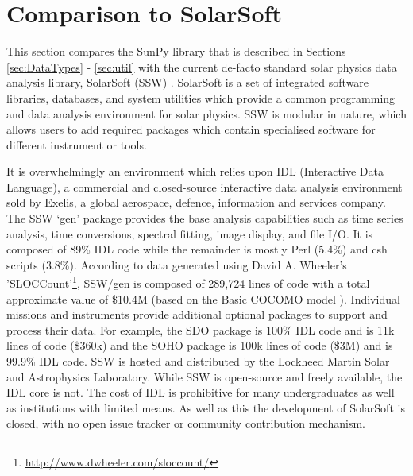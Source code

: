 \section{Comparison to SolarSoft}
This section compares the SunPy library that is described in Sections 
\ref{sec:DataTypes} - \ref{sec:util} with the current de-facto standard solar 
physics data analysis library, SolarSoft (SSW) \citep{freeland1998}.
SolarSoft is a set of integrated software libraries, databases, and system 
utilities which provide a common programming and data analysis environment for 
solar physics. SSW is modular in nature, which allows users to add required 
packages which contain specialised software for different instrument or tools.

It is overwhelmingly an environment which relies upon IDL (Interactive Data 
Language), a commercial and closed-source interactive data analysis environment 
sold by Exelis, a global aerospace, defence, information and services company. 
The SSW `gen' package provides the base analysis capabilities such as time 
series analysis, time conversions, spectral fitting, image display, and file 
I/O. It is composed of 89\% IDL code while the remainder is mostly Perl (5.4\%) 
and csh scripts (3.8\%). 
According to data generated using David A. Wheeler's 'SLOCCount'\footnote{\url{http://www.dwheeler.com/sloccount/}}, SSW/gen is composed of 
289,724 lines of code with a total approximate value of \$10.4M (based on the 
Basic COCOMO model \citep{_cocomo_2014}). 
Individual missions and instruments provide additional optional packages to 
support and process their data. For example, the SDO package \citep{sdo} is 
100\% IDL code and is 11k lines of code (\$360k) and the SOHO package 
\citep{soho} is 100k lines of code (\$3M) and is 99.9\% IDL code. SSW is hosted 
and distributed by the Lockheed Martin Solar and Astrophysics Laboratory.
While SSW is open-source and freely available, the IDL core is not. The cost 
of IDL is prohibitive for many undergraduates as well as institutions 
with limited means. As well as this the development of SolarSoft is closed, 
with no open issue tracker or community contribution mechanism.

